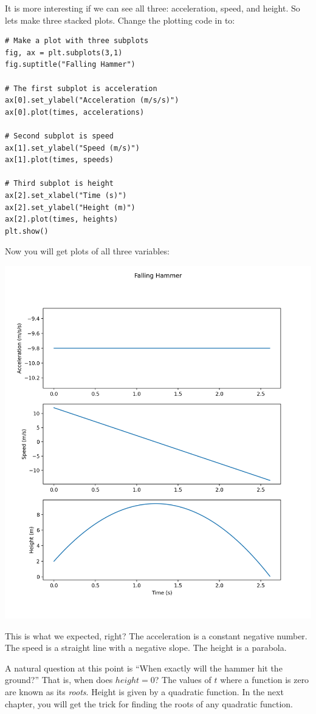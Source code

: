 It is more interesting if we can see all three: acceleration, speed, and height. 
So lets make three stacked plots.  Change the plotting code in  to:

\begin{Verbatim}
# Make a plot with three subplots
fig, ax = plt.subplots(3,1)
fig.suptitle("Falling Hammer")

# The first subplot is acceleration
ax[0].set_ylabel("Acceleration (m/s/s)")
ax[0].plot(times, accelerations)

# Second subplot is speed
ax[1].set_ylabel("Speed (m/s)")
ax[1].plot(times, speeds)

# Third subplot is height
ax[2].set_xlabel("Time (s)")
ax[2].set_ylabel("Height (m)")
ax[2].plot(times, heights)
plt.show()
\end{Verbatim}

Now you will get plots of all three variables:

\includegraphics[width=0.8\linewidth]{stackedplot.png}

This is what we expected, right?  The acceleration is a constant negative number.  The speed is a
straight line with a negative slope.  The height is a parabola.

A natural question at this point is ``When exactly will the hammer hit the
ground?''  That is, when does $height = 0$? The values of $t$ where a function is zero are
known as its \textit{roots}. Height is given by a quadratic function. In the next
chapter, you will get the trick for finding the roots of any quadratic
function.

